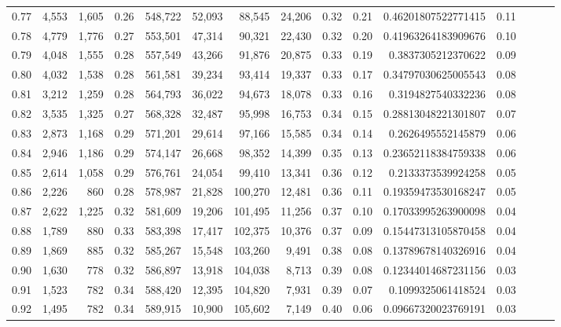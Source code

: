 \begin{tabular}{rrrrrrrrrrrrrrr}
0.77 &   4,553 &  1,605 &  0.26 &  548,722 &   52,093 &   88,545 &   24,206 &  0.32 &  0.21 &   0.46201807522771415 &      0.11 \\
0.78 &   4,779 &  1,776 &  0.27 &  553,501 &   47,314 &   90,321 &   22,430 &  0.32 &  0.20 &   0.41963264183909676 &      0.10 \\
0.79 &   4,048 &  1,555 &  0.28 &  557,549 &   43,266 &   91,876 &   20,875 &  0.33 &  0.19 &    0.3837305212370622 &      0.09 \\
0.80 &   4,032 &  1,538 &  0.28 &  561,581 &   39,234 &   93,414 &   19,337 &  0.33 &  0.17 &   0.34797030625005543 &      0.08 \\
0.81 &   3,212 &  1,259 &  0.28 &  564,793 &   36,022 &   94,673 &   18,078 &  0.33 &  0.16 &    0.3194827540332236 &      0.08 \\
0.82 &   3,535 &  1,325 &  0.27 &  568,328 &   32,487 &   95,998 &   16,753 &  0.34 &  0.15 &   0.28813048221301807 &      0.07 \\
0.83 &   2,873 &  1,168 &  0.29 &  571,201 &   29,614 &   97,166 &   15,585 &  0.34 &  0.14 &    0.2626495552145879 &      0.06 \\
0.84 &   2,946 &  1,186 &  0.29 &  574,147 &   26,668 &   98,352 &   14,399 &  0.35 &  0.13 &   0.23652118384759338 &      0.06 \\
0.85 &   2,614 &  1,058 &  0.29 &  576,761 &   24,054 &   99,410 &   13,341 &  0.36 &  0.12 &    0.2133373539924258 &      0.05 \\
0.86 &   2,226 &    860 &  0.28 &  578,987 &   21,828 &  100,270 &   12,481 &  0.36 &  0.11 &   0.19359473530168247 &      0.05 \\
0.87 &   2,622 &  1,225 &  0.32 &  581,609 &   19,206 &  101,495 &   11,256 &  0.37 &  0.10 &   0.17033995263900098 &      0.04 \\
0.88 &   1,789 &    880 &  0.33 &  583,398 &   17,417 &  102,375 &   10,376 &  0.37 &  0.09 &   0.15447313105870458 &      0.04 \\
0.89 &   1,869 &    885 &  0.32 &  585,267 &   15,548 &  103,260 &    9,491 &  0.38 &  0.08 &   0.13789678140326916 &      0.04 \\
0.90 &   1,630 &    778 &  0.32 &  586,897 &   13,918 &  104,038 &    8,713 &  0.39 &  0.08 &   0.12344014687231156 &      0.03 \\
0.91 &   1,523 &    782 &  0.34 &  588,420 &   12,395 &  104,820 &    7,931 &  0.39 &  0.07 &    0.1099325061418524 &      0.03 \\
0.92 &   1,495 &    782 &  0.34 &  589,915 &   10,900 &  105,602 &    7,149 &  0.40 &  0.06 &   0.09667320023769191 &      0.03 \\

\end{tabular}
